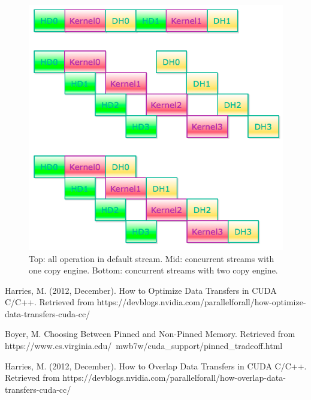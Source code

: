 \documentclass[journal,12pt,onecolumn,draftclsnofoot]{ieeeconf}  %
\begin{document}
\begin{figure}[h]
	\centering\includegraphics[width=120mm]{concurrent.png}
	\caption{Top: all operation in default stream. Mid: concurrent streams with one copy engine. Bottom: concurrent streams with two copy engine.}
	\label{Top: all operation in default stream. Mid: concurrent streams with one copy engine. Bottom: concurrent streams with two copy engine.}
\end{figure}


\begin{thebibliography}{9}
Harries, M. (2012, December). How to Optimize Data Transfers in CUDA C/C++. Retrieved from https://devblogs.nvidia.com/parallelforall/how-optimize-data-transfers-cuda-cc/
	
Boyer, M. Choosing Between Pinned and Non-Pinned Memory. Retrieved from https://www.cs.virginia.edu/~mwb7w/cuda_support/pinned_tradeoff.html
	
Harries, M. (2012, December). How to Overlap Data Transfers in CUDA C/C++. Retrieved from https://devblogs.nvidia.com/parallelforall/how-overlap-data-transfers-cuda-cc/
	

\end{thebibliography}
\end{document}
